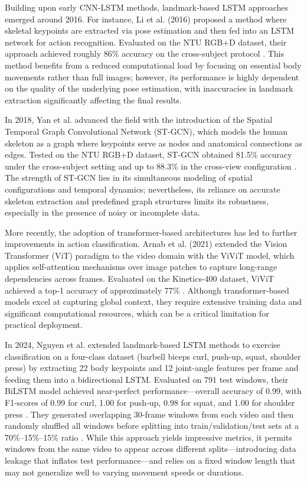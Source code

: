 \documentclass[journal,onecolumn, 11pt]{IEEEtran}
\begin{document}
Building upon early CNN-LSTM methods, landmark-based LSTM approaches emerged around 2016. For instance, Li et al. (2016) proposed a method where skeletal keypoints are extracted via pose estimation and then fed into an LSTM network for action recognition. Evaluated on the NTU RGB+D dataset, their approach achieved roughly 86\% accuracy on the cross-subject protocol \cite{li2017}. This method benefits from a reduced computational load by focusing on essential body movements rather than full images; however, its performance is highly dependent on the quality of the underlying pose estimation, with inaccuracies in landmark extraction significantly affecting the final results.

In 2018, Yan et al. advanced the field with the introduction of the Spatial Temporal Graph Convolutional Network (ST-GCN), which models the human skeleton as a graph where keypoints serve as nodes and anatomical connections as edges. Tested on the NTU RGB+D dataset, ST-GCN obtained 81.5\% accuracy under the cross-subject setting and up to 88.3\% in the cross-view configuration \cite{yan2018}. The strength of ST-GCN lies in its simultaneous modeling of spatial configurations and temporal dynamics; nevertheless, its reliance on accurate skeleton extraction and predefined graph structures limits its robustness, especially in the presence of noisy or incomplete data.

More recently, the adoption of transformer-based architectures has led to further improvements in action classification. Arnab et al. (2021) extended the Vision Transformer (ViT) paradigm to the video domain with the ViViT model, which applies self-attention mechanisms over image patches to capture long-range dependencies across frames. Evaluated on the Kinetics-400 dataset, ViViT achieved a top-1 accuracy of approximately 77\% \cite{arnab2021}. Although transformer-based models excel at capturing global context, they require extensive training data and significant computational resources, which can be a critical limitation for practical deployment.

In 2024, Nguyen et al. extended landmark-based LSTM methods to exercise classification on a four-class dataset (barbell biceps curl, push-up, squat, shoulder press) by extracting 22 body keypoints and 12 joint-angle features per frame and feeding them into a bidirectional LSTM. Evaluated on 791 test windows, their BiLSTM model achieved near-perfect performance—overall accuracy of 0.99, with F1-scores of 0.99 for curl, 1.00 for push-up, 0.98 for squat, and 1.00 for shoulder press . They generated overlapping 30-frame windows from each video and then randomly shuffled all windows before splitting into train/validation/test sets at a 70\%–15\%–15\% ratio . While this approach yields impressive metrics, it permits windows from the same video to appear across different splits—introducing data leakage that inflates test performance—and relies on a fixed window length that may not generalize well to varying movement speeds or durations.  \cite{riccio2024}
\end{document}
